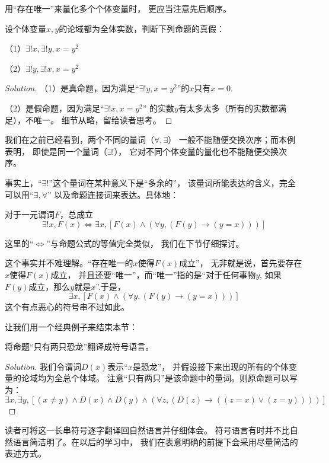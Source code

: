 用“存在唯一”来量化多个个体变量时，
更应当注意先后顺序。

\begin{example}
设个体变量$x,y$的论域都为全体实数，判断下列命题的真假：

（1）$\exists!x,\exists!y,x=y^2$

（2）$\exists!y,\exists!x,x=y^2$
\end{example}

\begin{proof}[Solution]
（1）是真命题，因为满足“$\exists!y,x=y^2$”的$x$只有$x=0$.

（2）是假命题，因为满足“$\exists!x,x=y^2$”
的实数$y$有太多太多（所有的实数都满足），不唯一。
细节从略，留给读者思考。
\end{proof}

我们在之前已经看到，两个不同的量词（$\forall,\exists$）
一般不能随便交换次序；而本例表明，
即使是同一个量词（$\exists!$），
它对不同个体变量的量化也不能随便交换次序。
\vs

事实上，“$\exists!$”这个量词在某种意义下是“多余的”，
该量词所能表达的含义，完全可以用“$\exists,\forall$”
以及命题连接词来表达。具体地：

\begin{thm}对于一元谓词$F$，总成立
$$\exists!x,F(x)\Leftrightarrow
\exists x,[F(x)\wedge(\forall y,(F(y)\rightarrow(y=x)))]$$
\end{thm}
这里的“$\Leftrightarrow$”与命题公式的等值完全类似，
我们在下节仔细探讨。

这个事实并不难理解。“存在唯一的$x$使得$F(x)$成立”，
无非就是说，首先要存在$x$使得$F(x)$成立，
并且还要“唯一”，而“唯一”指的是“对于任何事物$y$,
如果$F(y)$成立，那么$y$就是$x$”.于是，
$$\exists x,[F(x)\wedge(\forall y,(F(y)\rightarrow(y=x)))]$$
这个有点恶心的符号串不过如此。\vs

让我们用一个经典例子来结束本节：

\begin{example}
将命题“只有两只恐龙”翻译成符号语言。
\label{只有两只恐龙}
\end{example}

\begin{proof}[Solution]
我们令谓词$D(x)$表示“$x$是恐龙”，
并假设接下来出现的所有的个体变量的论域均为全总个体域。
注意“只有两只”是该命题中的量词。则原命题可以写为：
$$\exists x,\exists y,
[(x\neq y)\wedge D(x)\wedge D(y)\wedge
(\forall z,(D(z)\rightarrow((z=x)\vee(z=y))))]$$
\end{proof}

读者可将这一长串符号逐字翻译回自然语言并仔细体会。
符号语言有时并不比自然语言简洁明了。在以后的学习中，
我们在表意明确的前提下会采用尽量简洁的表述方式。


